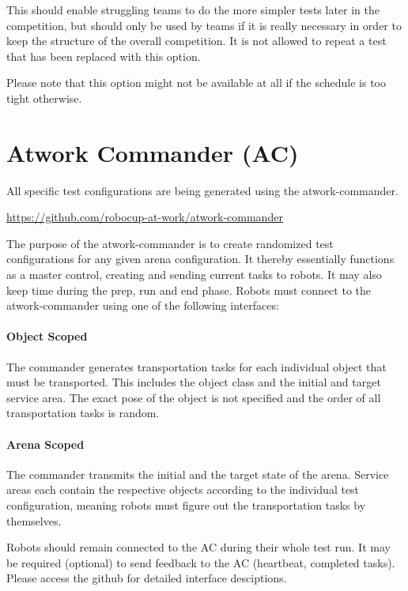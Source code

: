 This should enable struggling teams to do the more simpler tests later in the competition,
but should only be used by teams if it is really necessary in order to keep the structure of the overall competition. 
It is not allowed to repeat a test that has been replaced with this option.

Please note that this option might not be available at all if the schedule is too tight otherwise.

\section{Atwork Commander (AC)}
\label{sec:atwork-commander}

All specific test configurations are being generated using the atwork-commander.

\begin{center}
	\url{https://github.com/robocup-at-work/atwork-commander}
\end{center}

The purpose of the atwork-commander is to create randomized test configurations for any given arena configuration.
It thereby essentially functions as a master control, creating and sending current tasks to robots.
It may also keep time during the prep, run and end phase.
Robots must connect to the atwork-commander using one of the following interfaces:

\paragraph{Object Scoped}
The commander generates transportation tasks for each individual object that must be transported.
This includes the object class and the initial and target service area.
The exact pose of the object is not specified and the order of all transportation tasks is random.

\paragraph{Arena Scoped}
The commander transmits the initial and the target state of the arena.
Service areas each contain the respective objects according to the individual test configuration,
meaning robots must figure out the transportation tasks by themselves.

Robots should remain connected to the AC during their whole test run.
It may be required (optional) to send feedback to the AC (heartbeat, completed tasks).
Please access the github for detailed interface desciptions.

